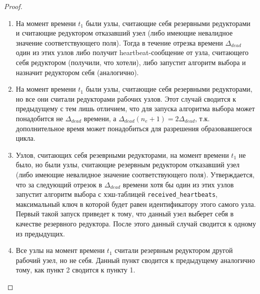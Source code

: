 \documentclass{article}
\theoremstyle{plain}
\theoremstyle{plain}
\theoremstyle{plain}
\theoremstyle{plain}
\theoremstyle{definition}
\theoremstyle{remark}
\theoremstyle{plain}
\begin{document}
\begin{proof}
    \begin{enumerate}
        \item На момент времени $t_1$ были узлы, считающие себя резервными редукторами и считающие редуктором отказавший узел (либо имеющие невалидное значение соответствующего поля). Тогда в течение отрезка времени $\Delta_{dead}$ один из этих узлов либо получит heartbeat-сообщение от узла, считающего себя редуктором (получили, что хотели), либо запустит алгоритм выбора и назначит редуктором себя (аналогично).
        
        \item На момент времени $t_1$ были узлы, считающие себя резервными редукторами, но все они считали редукторами рабочих узлов. Этот случай сводится к предыдущему с тем лишь отличием, что для запуска алгоритма выбора может понадобится не $\Delta_{dead}$ времени, а $\Delta_{dead} (n_e + 1) = 2\Delta_{dead}$, т.к. дополнительное время может понадобиться для разрешения образовавшегося цикла.
    
        \item Узлов, считающих себя резеврными редукторами, на момент времени $t_1$ не было, но были узлы, считающие резервным редуктором отказавший узел (либо имеющие невалидное значение соответствующего поля). Утверждается, что за следующий отрезок в $\Delta_{dead}$ времени хотя бы один из этих узлов запустит алгоритм выбора с хэш-таблицей \texttt{received\_heartbeats}, максимальный ключ в которой будет равен идентификатору этого самого узла. Первый такой запуск приведет к тому, что данный узел выберет себя в качестве резервного редуктора. После этого данный случай сводится к одному из предыдущих.
        
        \item Все узлы на момент времени $t_1$ считали резервным редуктором другой рабочий узел, но не себя. Данный пункт сводится к предыдущему аналогично тому, как пункт 2 сводится к пункту 1.
    \end{enumerate}
    

\end{proof}
\end{document}
